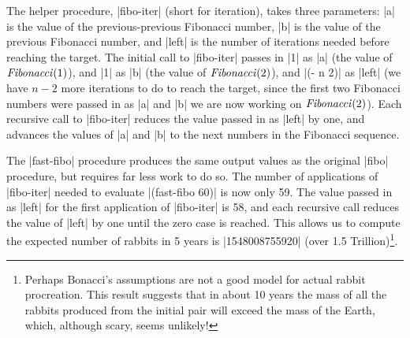 \begin{schemeregion}
{The helper procedure, \scheme|fibo-iter| (short for iteration), takes three parameters: \scheme|a| is the value of the previous-previous Fibonacci number, \scheme|b| is the value of the previous Fibonacci number, and \scheme|left| is the number of iterations needed before reaching the target.  The initial call to \scheme|fibo-iter| passes in \scheme|1| as \scheme|a| (the value of $\textrm{\emph{Fibonacci}}(1)$), and \scheme|1| as \scheme|b| (the value of $\textrm{\emph{Fibonacci}}(2)$), and \scheme|(- n 2)| as \scheme|left| (we have $n - 2$ more iterations to do to reach the target, since the first two Fibonacci numbers were passed in as \scheme|a| and \scheme|b| we are now working on $\textrm{\emph{Fibonacci}}(2)$).  Each recursive call to \scheme|fibo-iter| reduces the value passed in as \scheme|left| by one, and advances the values of \scheme|a| and \scheme|b| to the next numbers in the Fibonacci sequence.


The \scheme|fast-fibo| procedure produces the same output values as the original \scheme|fibo| procedure, but requires far less work to do so.  The number of applications of \scheme|fibo-iter| needed to evaluate \scheme|(fast-fibo 60)| is now only 59.  The value passed in as \scheme|left| for the first application of \scheme|fibo-iter| is 58, and each recursive call reduces the value of \scheme|left| by one until the zero case is reached.  This allows us to compute the expected number of rabbits in 5 years is \schemeresult|1548008755920| (over 1.5 Trillion)\footnote{Perhaps Bonacci's assumptions are not a good model for actual rabbit procreation.  This result suggests that in about 10 years the mass of all the rabbits produced from the initial pair will exceed the mass of the Earth, which, although scary, seems unlikely!}. 
}



\end{schemeregion}
